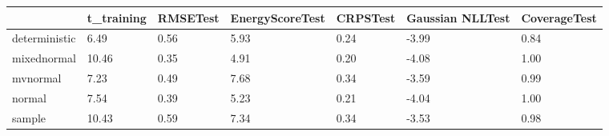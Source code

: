 \begin{tabular}{lllllll}
\toprule
 & t_training & RMSETest & EnergyScoreTest & CRPSTest & Gaussian NLLTest & CoverageTest \\
\midrule
deterministic & 6.49 & 0.56 & 5.93 & 0.24 & -3.99 & 0.84 \\
mixednormal & 10.46 & 0.35 & 4.91 & 0.20 & -4.08 & 1.00 \\
mvnormal & 7.23 & 0.49 & 7.68 & 0.34 & -3.59 & 0.99 \\
normal & 7.54 & 0.39 & 5.23 & 0.21 & -4.04 & 1.00 \\
sample & 10.43 & 0.59 & 7.34 & 0.34 & -3.53 & 0.98 \\
\bottomrule
\end{tabular}
